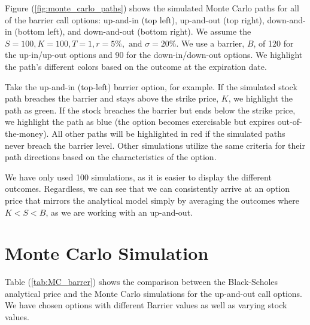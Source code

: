 Figure (\ref{fig:monte_carlo_paths}) shows the simulated Monte Carlo paths for all of the barrier call options: up-and-in (top left), up-and-out (top right), down-and-in (bottom left), and down-and-out (bottom right). We assume the $S=100, K=100, T=1,r=5\%,\text{ and } \sigma=20\%$. We use a barrier, $B$, of 120 for the up-in/up-out options and 90 for the down-in/down-out options. We highlight the path's different colors based on the outcome at the expiration date. 

Take the up-and-in (top-left) barrier option, for example. If the simulated stock path breaches the barrier and stays above the strike price, $K$, we highlight the path as green. If the stock breaches the barrier but ends below the strike price, we highlight the path as blue (the option becomes exercisable but expires out-of-the-money). All other paths will be highlighted in red if the simulated paths never breach the barrier level. Other simulations utilize the same criteria for their path directions based on the characteristics of the option. 

We have only used 100 simulations, as it is easier to display the different outcomes. Regardless, we can see that we can consistently arrive at an option price that mirrors the analytical model simply by averaging the outcomes where $K<S<B$, as we are working with an up-and-out.
\newpage
\section{Monte Carlo Simulation}

Table (\ref{tab:MC_barrer}) shows the comparison between the Black-Scholes analytical price and the Monte Carlo simulations for the up-and-out call options. We have chosen options with different Barrier values as well as varying stock values.


